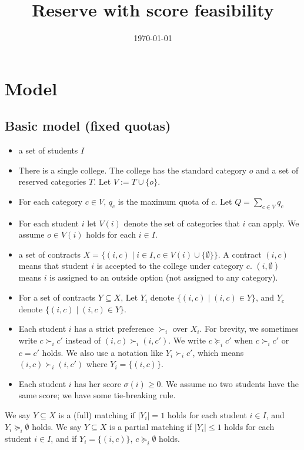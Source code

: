\documentclass{article}
\title{Reserve with score feasibility}
\author{}
\date{\today}
\begin{document}
\maketitle

\section{Model}
\subsection{Basic model (fixed quotas)}
\begin{itemize}
    \item a set of students $I$
    \item There is a single college. 
    The college has the standard category $o$ and 
    a set of reserved categories $T$. Let $V:= T \cup \{o\}$.
\item For each category $c \in V$, $q_c$ is the maximum quota
of $c$. Let $Q=\sum_{c \in V} q_c$
\item For each student $i$ let $V(i)$ denote 
the set of categories that $i$ can apply. 
We assume $o \in V(i)$ holds for each $i\in I$. 
\item a set of contracts 
$X = \{(i,c) \mid i\in I, c \in V(i)\cup\{\emptyset\}\}$.
A contract $(i,c)$ means that student $i$ is accepted to the college under 
category $c$. $(i,\emptyset)$ means $i$ is assigned to an outside option (not assigned to 
any category). 
\item For a set of contracts $Y\subseteq X$, 
Let $Y_i$ denote $\{(i,c) \mid (i,c) \in Y\}$, 
and $Y_c$ denote $\{(i,c) \mid (i,c) \in Y\}$.
\item Each student $i$ has a strict preference $\succ_i$ 
over $X_i$. For brevity, we sometimes write $c \succ_i c'$ 
instead of $(i,c)\succ_i (i,c')$. We write $c \succeq_i c'$ 
when $c \succ_i c'$ or $c=c'$ holds. 
We also use a notation like $Y_i \succ_i c'$, which means
$(i,c) \succ_i (i,c')$ where $Y_i=\{(i,c)\}$.

\item Each student $i$ has her score $\sigma(i) \ge 0$. 
We assume no two students have the same score; we have some tie-breaking rule. 
\end{itemize}

We say $Y\subseteq X$ is a (full) matching 
if $|Y_i|=1$ holds for each student $i \in I$, and
$Y_i \succeq_i \emptyset$ holds. 
We say $Y\subseteq X$ is a partial matching 
if $|Y_i|\le 1$ holds for each student $i \in I$, and
if $Y_i=\{(i,c)\}$, $c \succeq_i \emptyset$ holds. 
\end{document}
